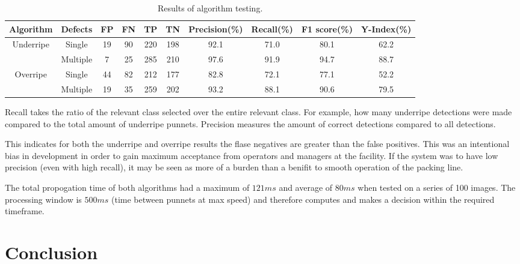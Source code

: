 \documentclass{bmvc2k}
\begin{document}
\begin{table*}
	\caption{Results of algorithm testing.}
	\label{tab:algo_test}
	\centering
	\small
	\setlength\tabcolsep{2pt}
	\begin{tabular}{cccccccccc}
		\hline\hline
		Algorithm & Defects & FP  & FN  & TP  & TN  & Precision(\%) & Recall(\%) & F1 score(\%) & Y-Index(\%)\\ 
		\hline
		Underripe   & Single   & 19 & 90 & 220 & 198 & 92.1 & 71.0 & 80.1 & 62.2 \\[6pt] 
		& Multiple & 7  & 25 & 285 & 210 & 97.6 & 91.9 & 94.7 & 88.7 \\[6pt]
		Overripe    & Single   & 44 & 82 & 212 & 177 & 82.8 & 72.1 & 77.1 & 52.2 \\[6pt]
		& Multiple & 19 & 35 & 259 & 202 & 93.2 & 88.1 & 90.6 & 79.5 \\[6pt]	 
		\hline\hline
	\end{tabular}
\end{table*}







Recall takes the ratio of the relevant class selected over the entire relevant class. For example, how many underripe detections were made compared to the total amount of underripe punnets. Precision measures the amount of correct detections compared to all detections. 

This indicates for both the underripe and overripe results the flase negatives are greater than the false positives. This was an intentional bias in development in order to gain maximum acceptance from operators and managers at the facility. If the system was to have low precision (even with high recall), it may be seen as more of a burden than a benifit to smooth operation of the packing line.

The total propogation time of both algorithms had a maximum of $121ms$ and average of $80ms$ when tested on a series of 100 images. The processing window is $500ms$ (time between punnets at max speed) and therefore computes and makes a decision within the required timeframe.




\section{Conclusion}
\end{document}
